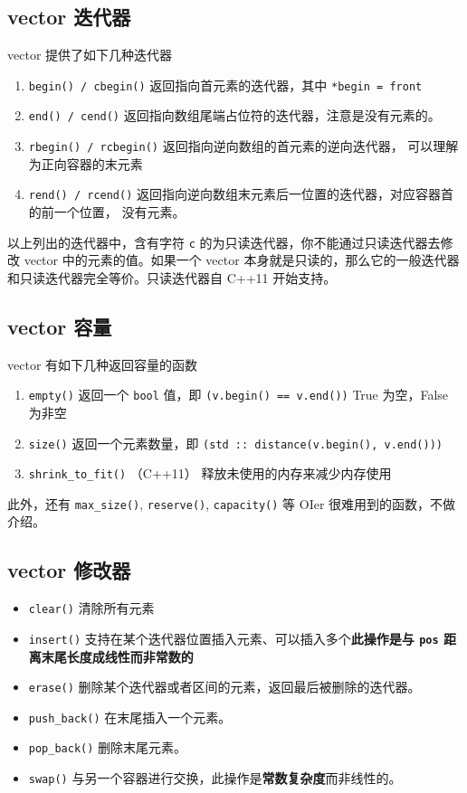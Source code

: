 \subsection{vector 迭代器}

vector 提供了如下几种迭代器

\begin{enumerate}
\item \texttt{begin() / cbegin()}
返回指向首元素的迭代器，其中 \texttt{*begin = front}
\item \texttt{end() / cend()}
返回指向数组尾端占位符的迭代器，注意是没有元素的。
\item \texttt{rbegin() / rcbegin()}
返回指向逆向数组的首元素的逆向迭代器， 可以理解为正向容器的末元素
\item \texttt{rend() / rcend()}
返回指向逆向数组末元素后一位置的迭代器，对应容器首的前一个位置， 没有元素。
\end{enumerate}

以上列出的迭代器中，含有字符 \texttt{c} 的为只读迭代器，你不能通过只读迭代器去修改 vector 中的元素的值。如果一个 vector 本身就是只读的，那么它的一般迭代器和只读迭代器完全等价。只读迭代器自 C++11 开始支持。

\subsection{vector 容量}

vector 有如下几种返回容量的函数

\begin{enumerate}
\item \texttt{empty()}
返回一个 \texttt{bool} 值，即 \texttt{(v.begin() == v.end())} True 为空，False 为非空
\item \texttt{size()}
返回一个元素数量，即 \texttt{(std :: distance(v.begin(), v.end()))}
\item \texttt{shrink\_to\_fit()} （C++11）
释放未使用的内存来减少内存使用
\end{enumerate}

此外，还有 \texttt{max\_size()}, \texttt{reserve()}, \texttt{capacity()} 等 OIer 很难用到的函数，不做介绍。

\subsection{vector 修改器}

\begin{itemize}
\item \texttt{clear()} 清除所有元素
\item \texttt{insert()} 支持在某个迭代器位置插入元素、可以插入多个\textbf{此操作是与 \texttt{pos} 距离末尾长度成线性而非常数的}
\item \texttt{erase()} 删除某个迭代器或者区间的元素，返回最后被删除的迭代器。
\item \texttt{push\_back()} 在末尾插入一个元素。
\item \texttt{pop\_back()} 删除末尾元素。
\item \texttt{swap()} 与另一个容器进行交换，此操作是\textbf{常数复杂度}而非线性的。
\end{itemize}

